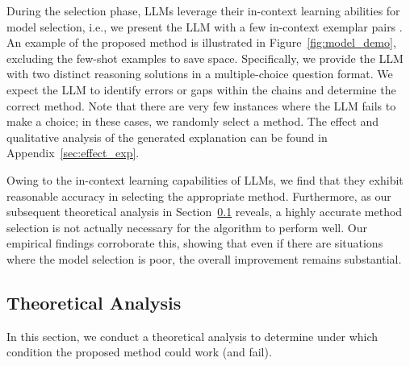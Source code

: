 \documentclass[11pt]{article}
\begin{document}
During the selection phase, LLMs leverage their in-context learning abilities for model selection, i.e., we present the LLM with a few in-context exemplar pairs . An example of the proposed method is illustrated in Figure~\ref{fig:model_demo}, excluding the few-shot examples to save space. Specifically, we provide the LLM with two distinct reasoning solutions in a multiple-choice question format. We expect the LLM to identify errors or gaps within the chains and determine the correct method. Note that there are very few instances where the LLM fails to make a choice; in these cases, we randomly select a method.  The effect and qualitative analysis of the generated explanation can be found in Appendix~\ref{sec:effect_exp}. 

Owing to the in-context learning capabilities of LLMs, we find that they exhibit reasonable accuracy in selecting the appropriate method. Furthermore, as our subsequent theoretical analysis in Section~\ref{sec:theory_analysis} reveals, a highly accurate method selection is not actually necessary for the algorithm to perform well. Our empirical findings corroborate this, showing that even if there are situations where the model selection is poor, the overall improvement remains substantial.


\subsection{Theoretical Analysis} \label{sec:theory_analysis}
In this section, we conduct a theoretical analysis to determine under which condition the proposed method could work (and fail). 
\end{document}
